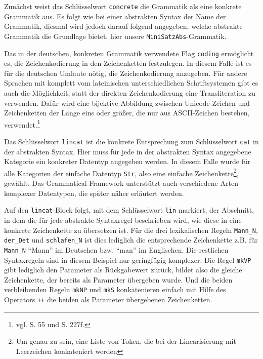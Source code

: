 

Zunächst weist das Schlüsselwort \texttt{concrete} die Grammatik als eine konkrete Grammatik aus. Es folgt wie bei einer abstrakten Syntax der Name der Grammatik, diesmal wird jedoch darauf folgend angegeben, welche abstrakte Grammatik die Grundlage bietet, hier unsere \texttt{MiniSatzAbs}-Grammatik. \par
Das in der deutschen, konkreten Grammatik verwendete Flag \texttt{coding} ermöglicht es, die Zeichenkodierung in den Zeichenketten festzulegen. In diesem Falle ist es für die deutschen Umlaute nötig, die Zeichenkodierung anzugeben. Für andere Sprachen mit komplett vom lateinischen unterschiedlichen Schriftsystemen gibt es auch die Möglichkeit, statt der direkten Zeichenkodierung eine Transliteration zu verwenden. Dafür wird eine bijektive Abbildung zwischen Unicode-Zeichen und Zeichenketten der Länge eins oder größer, die nur aus ASCII-Zeichen bestehen, verwendet.\footnote{vgl. \cite{RANTA2011} S. 55 und S. 227f.} \par
Das Schlüsselwort \texttt{lincat} ist die konkrete Entsprechung zum Schlüsselwort \texttt{cat} in der abstrakten Syntax. Hier muss für jede in der abstrakten Syntax angegebene Kategorie ein konkreter Datentyp angegeben werden. In diesem Falle wurde für alle Kategorien der einfache Datentyp \texttt{Str}, also eine einfache Zeichenkette\footnote{Um genau zu sein, eine Liste von Token, die bei der Linearisierung mit Leerzeichen konkateniert werden}, gewählt. Das Grammatical Framework unterstützt auch verschiedene Arten komplexer Datentypen, die später näher erläutert werden. \par
Auf den \texttt{lincat}-Block folgt, mit dem Schlüsselwort \texttt{lin} markiert, der Abschnitt, in dem die für jede abstrakte Syntaxregel beschrieben wird, wie diese in eine konkrete Zeichenkette zu übersetzen ist. Für die drei lexikalischen Regeln \texttt{Mann\_N}, \texttt{der\_Det} und \texttt{schlafen\_N} ist dies lediglich die entsprechende Zeichenkette z.B. für \texttt{Mann\_N} "`Mann"' im Deutschen bzw. "`man"' im Englischen. Die restlichen Syntaxregeln sind in diesem Beispiel nur geringfügig komplexer. Die Regel \texttt{mkVP} gibt lediglich den Parameter als Rückgabewert zurück, bildet also die gleiche Zeichenkette, der bereits als Parameter übergeben wurde. Und die beiden verbleibenden Regeln \texttt{mkNP} und \texttt{mkS} konkatenieren einfach mit Hilfe des Operators \texttt{++} die beiden als Parameter übergebenen Zeichenketten. \par
